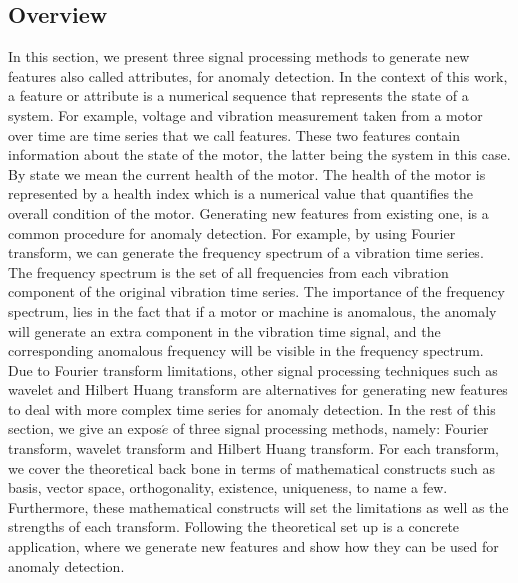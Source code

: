 \documentclass[11pt, oneside]{article}   	%
\begin{document}
\subsection{Overview}
 In this section, we present three signal processing methods to generate new features also called attributes, for anomaly detection. In the context of this work, a feature or attribute is a numerical sequence that represents the state of a system. For example, voltage and vibration measurement taken from a motor over time are time series that we call features. These two features contain information about the state of the motor, the latter being the system in this case. 
 By state we mean the current health of the motor. The health of the motor is represented by a health index which is a numerical value that quantifies the overall condition of the motor.
 \justify
 Generating new features from existing one, is a common procedure for anomaly detection. For example, by using Fourier transform, we can generate the frequency spectrum of a vibration time series. The frequency spectrum is the set of all frequencies from each vibration component of the original vibration time series. The importance of the frequency spectrum, lies in the fact that if a motor or machine is anomalous, the anomaly will generate an extra component in the vibration time signal, and the corresponding anomalous frequency will be visible in the frequency spectrum. Due to Fourier transform limitations, other signal processing techniques such as
  wavelet and Hilbert Huang transform are alternatives for generating new features to deal with more complex time series for anomaly detection.
 \justify
 In the rest of this section, we give an expos$\acute{e}$  of three signal processing methods, namely: Fourier transform, wavelet transform and Hilbert Huang transform. For each transform, we cover the theoretical back bone in terms of mathematical constructs such as basis, vector space, orthogonality, existence, uniqueness, to name a few. Furthermore, these mathematical constructs will set the limitations as well as the strengths of each transform. Following the theoretical set up is a concrete application, where we generate new features and show how they can be used for anomaly detection.
 
\end{document}
